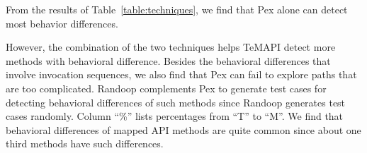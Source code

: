 From the results of Table~\ref{table:techniques}, we find that Pex alone can detect most behavior differences.

However, the combination of the two techniques helps TeMAPI detect more methods with behavioral difference. Besides the behavioral differences that involve invocation sequences, we also find that Pex can fail to explore paths that are too complicated. Randoop complements Pex to generate test cases for detecting behavioral differences of such methods since Randoop generates test cases randomly. Column ``\%'' lists percentages from ``T'' to ``M''. We find that behavioral differences of mapped API methods are quite common since about one third methods have such differences.

%
%
